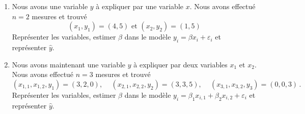\documentclass{../headers/td_upc}
\providecommand{\1}{\mathds{1}}
\begin{document}
	\newpage
	\begin{enumerate}
		\item Nous avons une variable $y$ à expliquer par une variable $x$. Nous avons effectué $n=2$ mesures et trouvé
		\[
		\left(x_{1}, y_{1}\right)=(4,5) \text { et }\left(x_{2}, y_{2}\right)=(1,5)
		\]
		Représenter les variables, estimer $\beta$ dans le modèle $y_{i}=\beta x_{i}+\varepsilon_{i}$ et représenter $\hat{y}$.
		\item Nous avons maintenant une variable $y$ à expliquer par deux variables $x_{1}$ et $x_{2}$. Nous avons effectué $n=3$ mesures et trouvé
		\[
		(x_{1,1}, x_{1,2},y_{1})=(3,2,0),\,\quad
		(x_{2,1}, x_{2,2}, y_{2})=(3,3,5),\,\quad
		(x_{3,1}, x_{3,2}, y_{3})=(0,0,3)\,.
		\]
		Représenter les variables, estimer $\beta$ dans le modèle $y_{i}=\beta_{1} x_{i, 1}+\beta_{2} x_{i, 2}+\varepsilon_{i}$
		et représenter $\hat{y}$.
	\end{enumerate}
	
\end{document}
